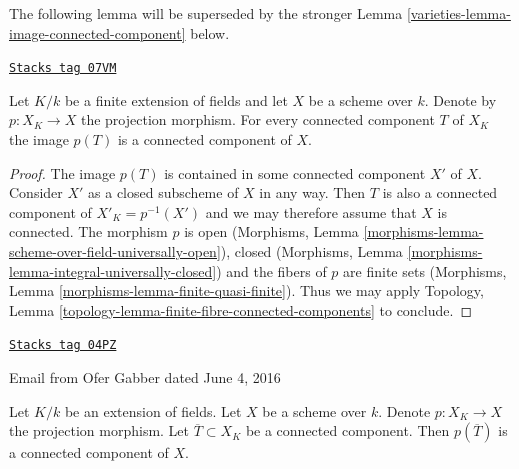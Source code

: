 The following lemma will be superseded by the stronger
Lemma \ref{varieties-lemma-image-connected-component} below.

\begin{lemma}
\label{varieties-lemma-image-connected-component-finite-extension}
\href{https://stacks.math.columbia.edu/tag/07VM}{\texttt{Stacks tag 07VM}}

Let $K/k$ be a finite extension of fields and let $X$ be a scheme over
$k$. Denote by $p : X_K \to X$ the projection morphism. For every connected
component $T$ of $X_K$ the image $p(T)$ is a connected component of
$X$.
\end{lemma}

\begin{proof}
The image $p(T)$ is contained in some connected component $X'$ of $X$. Consider
$X'$ as a closed subscheme of $X$ in any way. Then $T$ is also a connected
component of $X'_K = p^{-1}(X')$ and we may therefore assume that $X$ is
connected. The morphism $p$ is open
(Morphisms, Lemma \ref{morphisms-lemma-scheme-over-field-universally-open}),
closed
(Morphisms, Lemma \ref{morphisms-lemma-integral-universally-closed})
and the fibers of $p$ are finite sets
(Morphisms, Lemma \ref{morphisms-lemma-finite-quasi-finite}).
Thus we may apply
Topology, Lemma \ref{topology-lemma-finite-fibre-connected-components}
to conclude.
\end{proof}

\begin{lemma}[Gabber]

\label{varieties-lemma-image-connected-component}
\href{https://stacks.math.columbia.edu/tag/04PZ}{\texttt{Stacks tag 04PZ}}

\begin{reference}
Email from Ofer Gabber dated June 4, 2016
\end{reference}
Let $K/k$ be an extension of fields. Let $X$ be a scheme over $k$.
Denote $p : X_K \to X$ the projection morphism.
Let $\overline{T} \subset X_K$ be a connected component.
Then $p(\overline{T})$ is a connected component of $X$.
\end{lemma}

